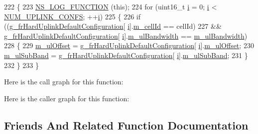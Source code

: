\begin{DoxyCode}
222 \{
223   \hyperlink{log-macros-disabled_8h_a90b90d5bad1f39cb1b64923ea94c0761}{NS\_LOG\_FUNCTION} (\textcolor{keyword}{this});
224   \textcolor{keywordflow}{for} (uint16\_t \hyperlink{bernuolliDistribution_8m_a6f6ccfcf58b31cb6412107d9d5281426}{i} = 0; \hyperlink{bernuolliDistribution_8m_a6f6ccfcf58b31cb6412107d9d5281426}{i} < \hyperlink{namespacens3_a5dc0a36a47c74fa76aa6f2db243f9478}{NUM\_UPLINK\_CONFS}; ++\hyperlink{bernuolliDistribution_8m_a6f6ccfcf58b31cb6412107d9d5281426}{i})
225     \{
226       \textcolor{keywordflow}{if} ((\hyperlink{namespacens3_a7c11930be582ce88ce6627e2b0204570}{g\_frHardUplinkDefaultConfiguration}[
      \hyperlink{bernuolliDistribution_8m_a6f6ccfcf58b31cb6412107d9d5281426}{i}].\hyperlink{classns3_1_1LteFfrAlgorithm_a0d6bc37b568679f27a18808d9cb36803}{m\_cellId} == cellId)
227           && \hyperlink{namespacens3_a7c11930be582ce88ce6627e2b0204570}{g\_frHardUplinkDefaultConfiguration}[
      \hyperlink{bernuolliDistribution_8m_a6f6ccfcf58b31cb6412107d9d5281426}{i}].\hyperlink{classns3_1_1LteFfrAlgorithm_acfa0105633ee5c27538c3309eb132d21}{m\_ulBandwidth} == \hyperlink{classns3_1_1LteFfrAlgorithm_acfa0105633ee5c27538c3309eb132d21}{m\_ulBandwidth})
228         \{
229           \hyperlink{classns3_1_1LteFrHardAlgorithm_aeb34fed1ca8ef811d999252782159bf7}{m\_ulOffset} = \hyperlink{namespacens3_a7c11930be582ce88ce6627e2b0204570}{g\_frHardUplinkDefaultConfiguration}[
      \hyperlink{bernuolliDistribution_8m_a6f6ccfcf58b31cb6412107d9d5281426}{i}].\hyperlink{structns3_1_1FrHardUplinkDefaultConfiguration_aa974511f8dafa96fa1dd406f4e6ea531}{m\_ulOffset};
230           \hyperlink{classns3_1_1LteFrHardAlgorithm_a70f1cda5f3524263e8718771c1233751}{m\_ulSubBand} = \hyperlink{namespacens3_a7c11930be582ce88ce6627e2b0204570}{g\_frHardUplinkDefaultConfiguration}[
      \hyperlink{bernuolliDistribution_8m_a6f6ccfcf58b31cb6412107d9d5281426}{i}].\hyperlink{structns3_1_1FrHardUplinkDefaultConfiguration_a70dc0aa992c216181d96488a9ed1d93a}{m\_ulSubBand};
231         \}
232     \}
233 \}
\end{DoxyCode}


Here is the call graph for this function\+:




Here is the caller graph for this function\+:




\subsection{Friends And Related Function Documentation}
